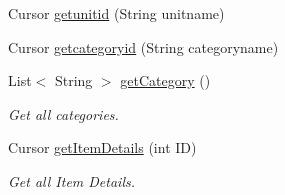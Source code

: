 \begin{DoxyCompactItemize}
\item 
Cursor \hyperlink{classcom_1_1example_1_1santh_1_1shoppinglist_1_1_data_base_manager_a24c43da6384cbe3a244f30d9583011fa}{getunitid} (String unitname)
\item 
Cursor \hyperlink{classcom_1_1example_1_1santh_1_1shoppinglist_1_1_data_base_manager_a85b785ca8012c85c5fc1ccb548b361fd}{getcategoryid} (String categoryname)
\item 
List$<$ String $>$ \hyperlink{classcom_1_1example_1_1santh_1_1shoppinglist_1_1_data_base_manager_a3e0f1f4eeebc8f8fa50fd3a978b3ec21}{get\+Category} ()
\begin{DoxyCompactList}\small\item\em Get all categories. \end{DoxyCompactList}\item 
Cursor \hyperlink{classcom_1_1example_1_1santh_1_1shoppinglist_1_1_data_base_manager_a53d1ac0f496bbb3e4e7f8ff35ff6f159}{get\+Item\+Details} (int ID)
\begin{DoxyCompactList}\small\item\em Get all Item Details. \end{DoxyCompactList}\end{DoxyCompactItemize}
